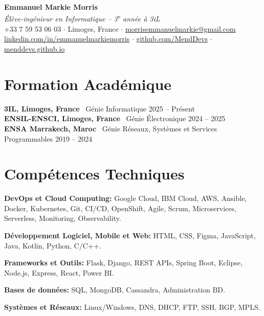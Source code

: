 \documentclass[10pt, letterpaper]{article}
\begin{document}
\begin{center}
\textbf{\LARGE Emmanuel Markie Morris} \\
\vspace{2pt}
\normalsize
\textit{\'El\`eve-ing\'enieur en Informatique -- 3\textsuperscript{e} ann\'ee \`a 3iL} \\
+33 7 59 53 06 03 $\cdot$ Limoges, France $\cdot$ 
\href{mailto:morrisemmanuelmarkie@gmail.com}{morrisemmanuelmarkie@gmail.com} \\
\href{https://www.linkedin.com/in/emmanuelmarkiemorris}{linkedin.com/in/emmanuelmarkiemorris} $\cdot$
\href{https://github.com/MendDevs}{github.com/MendDevs} $\cdot$
\href{https://menddevs.github.io}{menddevs.github.io}
\end{center}



\section*{Formation Acad\'emique}
\textbf{3IL, Limoges, France} \
G\'enie Informatique \hfill  2025 -- Pr\'esent \\
\textbf{ENSIL-ENSCI, Limoges, France} \
G\'enie \'Electronique \hfill 2024 -- 2025 \\
\textbf{ENSA Marrakech, Maroc} \
G\'enie R\'eseaux, Syst\`emes et Services Programmables \hfill 2019 -- 2024

\section*{Comp\'etences Techniques}
\textbf{DevOps et Cloud Computing:} Google Cloud, IBM Cloud, AWS, Ansible, Docker, Kubernetes, Git, CI/CD, OpenShift, Agile, Scrum, Microservices, Serverless, Monitoring, Observability.

\vspace{2.1mm}
\textbf{D\'eveloppement Logiciel, Mobile et Web:} HTML, CSS, Figma, JavaScript, Java, Kotlin, Python, C/C++.

\vspace{2.1mm}
\textbf{Frameworks et Outils:} Flask, Django, REST APIs, Spring Boot, Eclipse, Node.js, Express, React, Power BI.

\vspace{2.1mm}
\textbf{Bases de donn\'ees:} SQL, MongoDB, Cassandra, Administration BD.

\vspace{2.1mm}
\textbf{Syst\`emes et R\'eseaux:} Linux/Windows, DNS, DHCP, FTP, SSH, BGP, MPLS.
\end{document}

